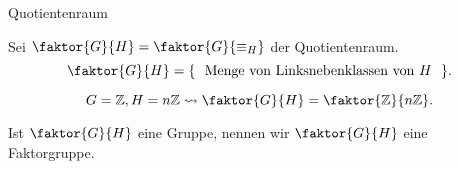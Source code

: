 \documentclass[class=article, crop=false]{standalone}
\begin{document}
\begin{zettel}{Quotientenraum}
\begin{flashcard}[]{}
	Sei $\faktor{G}{H} = \faktor{G}{\equiv_H}$ der Quotientenraum.
	\[
		\faktor{G}{H} = \set{\tx{ Menge von Linksnebenklassen von $H$ } }
	.\]
\end{flashcard}

\begin{example}
	\[
		G = \mathbb{Z}, H =  n \mathbb{Z} \rightsquigarrow \faktor{G}{H} =  \faktor{\mathbb{Z}}{n \mathbb{Z}}
	.\]
\end{example}

Ist $\faktor{G}{H}$ eine Gruppe, nennen wir $\faktor{G}{H}$ eine Faktorgruppe.

\end{zettel}
\end{document}
